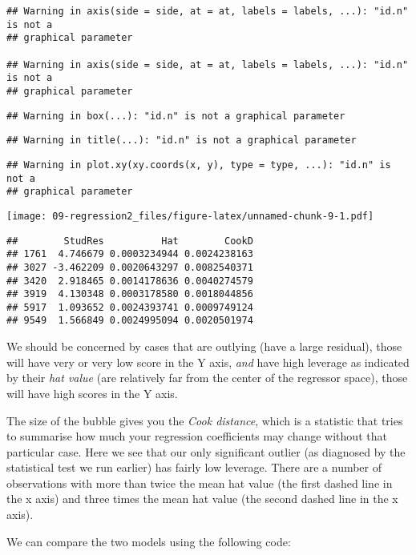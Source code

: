 \documentclass[
]{book}
\begin{document}
\begin{verbatim}
## Warning in axis(side = side, at = at, labels = labels, ...): "id.n" is not a
## graphical parameter

## Warning in axis(side = side, at = at, labels = labels, ...): "id.n" is not a
## graphical parameter
\end{verbatim}

\begin{verbatim}
## Warning in box(...): "id.n" is not a graphical parameter
\end{verbatim}

\begin{verbatim}
## Warning in title(...): "id.n" is not a graphical parameter
\end{verbatim}

\begin{verbatim}
## Warning in plot.xy(xy.coords(x, y), type = type, ...): "id.n" is not a
## graphical parameter
\end{verbatim}

\texttt{[image: 09-regression2\_files/figure-latex/unnamed-chunk-9-1.pdf]}

\begin{verbatim}
##        StudRes          Hat        CookD
## 1761  4.746679 0.0003234944 0.0024238163
## 3027 -3.462209 0.0020643297 0.0082540371
## 3420  2.918465 0.0014178636 0.0040274579
## 3919  4.130348 0.0003178580 0.0018044856
## 5917  1.093652 0.0024393741 0.0009749124
## 9549  1.566849 0.0024995094 0.0020501974
\end{verbatim}

We should be concerned by cases that are outlying (have a large residual), those will have very or very low score in the Y axis, \emph{and} have high leverage as indicated by their \emph{hat value} (are relatively far from the center of the regressor space), those will have high scores in the Y axis.

The size of the bubble gives you the \emph{Cook distance}, which is a statistic that tries to summarise how much your regression coefficients may change without that particular case. Here we see that our only significant outlier (as diagnosed by the statistical test we run earlier) has fairly low leverage. There are a number of observations with more than twice the mean hat value (the first dashed line in the x axis) and three times the mean hat value (the second dashed line in the x axis).

We can compare the two models using the following code:
\end{document}
